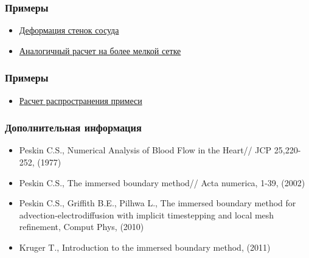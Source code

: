 \documentclass[14pt]{beamer}
\begin{document}
\begin{frame}
\frametitle{Примеры}
\begin{itemize}
    \item \href{run:video/cylinder1.avi}{Деформация стенок сосуда}
    \item \href{run:video/cylinder2.avi}{Аналогичный расчет на более мелкой сетке}
\end{itemize}
\end{frame}

\begin{frame}
\frametitle{Примеры}
\begin{itemize}
    \item \href{run:video/cylinder_density_pressure.avi}{Расчет распространения примеси}
\end{itemize}
\end{frame}

\begin{frame}
\frametitle{Дополнительная информация}
    \begin{itemize}
        \item Peskin C.S., Numerical Analysis of Blood Flow in the Heart// JCP 25,220-252, (1977)
        \item Peskin C.S., The immersed boundary method// Acta numerica, 1-39, (2002)
        \item Peskin C.S., Griffith B.E., Pilhwa L., The immersed boundary method for advection-electrodiffusion with implicit timestepping and local mesh refinement, Comput Phys, (2010)
        \item Kruger T., Introduction to the immersed boundary method, (2011)
    \end{itemize}
\end{frame}
\end{document}
